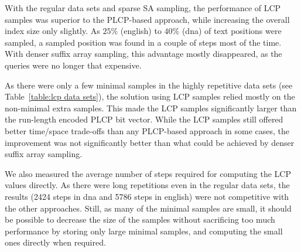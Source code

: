 With the regular data sets and sparse SA sampling, the performance of LCP samples was superior to the PLCP-based approach, while increasing the overall index size only slightly. As $25\%$ (english) to $40\%$ (dna) of text positions were sampled, a sampled position was found in a couple of steps most of the time. With denser suffix array sampling, this advantage mostly disappeared, as the \locate{} queries were no longer that expensive.

As there were only a few minimal samples in the highly repetitive data sets (see Table~\ref{table:lcp data sets}), the solution using LCP samples relied mostly on the non-minimal extra samples. This made the LCP samples significantly larger than the run-length encoded PLCP bit vector. While the LCP samples still offered better time/space trade-offs than any PLCP-based approach in some cases, the improvement was not significantly better than what could be achieved by denser suffix array sampling.

We also measured the average number of steps required for computing the LCP values directly. As there were long repetitions even in the regular data sets, the results (2424 steps in dna and 5786 steps in english) were not competitive with the other approaches. Still, as many of the minimal samples are small, it should be possible to decrease the size of the samples without sacrificing too much performance by storing only large minimal samples, and computing the small ones directly when required.
